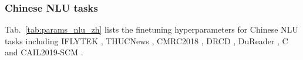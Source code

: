 \documentclass[11pt,a4paper]{article}
\newcommand{\mname}{\textsc{ERNIE-Doc}\xspace}
\begin{document}
\begin{table}[!h]
\centering
{}
\caption{Finetuning hyperparameters on the OpenKP for base-size \mname.}
\label{tab:params_kp_en}
\vspace{-0.5cm}
\end{table}

\subsubsection{Chinese NLU tasks}
Tab.~\ref{tab:params_nlu_zh} lists the finetuning hyperparameters for Chinese NLU tasks including IFLYTEK \citep{iflytek}, THUCNews \citep{thucnews}, CMRC2018 \citep{cmrc2018}, DRCD \citep{drcd}, DuReader \citet{dureader}, C \citep{c3} and CAIL2019-SCM \citep{cail}.
\end{document}
